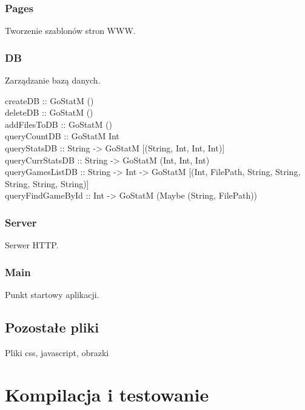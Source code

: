 \documentclass[10pt,leqno]{article}
\begin{document}
\subsubsection{Pages}
Tworzenie szablonów stron WWW.

\subsubsection{DB}
Zarządzanie bazą danych.

\begin{framed}
\noindent createDB :: GoStatM () \\
deleteDB :: GoStatM () \\
addFilesToDB :: GoStatM () \\
queryCountDB :: GoStatM Int \\
queryStatsDB :: String -> GoStatM [(String, Int, Int, Int)] \\
queryCurrStatsDB :: String -> GoStatM (Int, Int, Int) \\
queryGamesListDB :: String -> Int -> GoStatM [(Int, FilePath, String, String, String, String, String)] \\
queryFindGameById :: Int -> GoStatM (Maybe (String, FilePath))
\end{framed}          

\subsubsection{Server}
Serwer HTTP. 

\subsubsection{Main}
Punkt startowy aplikacji.




\subsection{Pozostałe pliki}
Pliki css, javascript, obrazki

\section{Kompilacja i testowanie}
\end{document}
